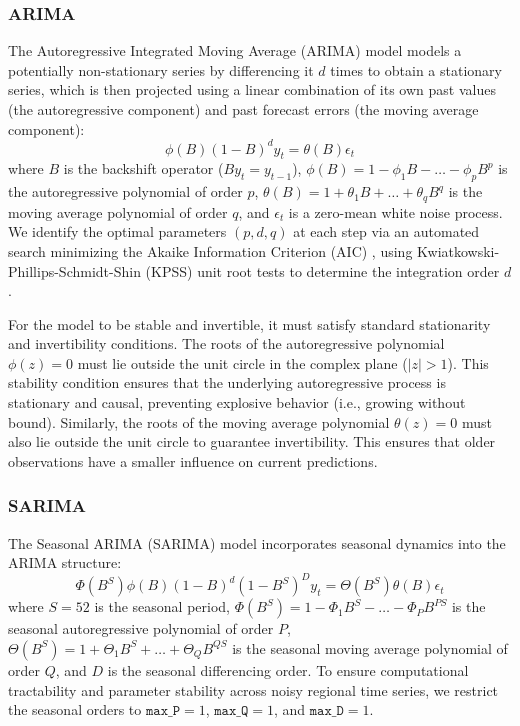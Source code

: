 \subsubsection{ARIMA}
The Autoregressive Integrated Moving Average (ARIMA) model \cite{boxjenkins} models a potentially non-stationary series by differencing it $d$ times to obtain a stationary series, which is then projected using a linear combination of its own past values (the autoregressive component) and past forecast errors (the moving average component):
\begin{equation}
\phi(B)(1-B)^d y_t = \theta(B)\epsilon_t
\end{equation}
where $B$ is the backshift operator ($B y_t = y_{t-1}$), $\phi(B) = 1 - \phi_1 B - \dots - \phi_p B^p$ is the autoregressive polynomial of order $p$, $\theta(B) = 1 + \theta_1 B + \dots + \theta_q B^q$ is the moving average polynomial of order $q$, and $\epsilon_t$ is a zero-mean white noise process. We identify the optimal parameters $(p, d, q)$ at each step via an automated search minimizing the Akaike Information Criterion (AIC) \cite{hyndman2008automatic}, using Kwiatkowski-Phillips-Schmidt-Shin (KPSS) unit root tests to determine the integration order $d$.

For the model to be stable and invertible, it must satisfy standard stationarity and invertibility conditions. The roots of the autoregressive polynomial $\phi(z) = 0$ must lie outside the unit circle in the complex plane ($|z| > 1$). This stability condition ensures that the underlying autoregressive process is stationary and causal, preventing explosive behavior (i.e., growing without bound). Similarly, the roots of the moving average polynomial $\theta(z) = 0$ must also lie outside the unit circle to guarantee invertibility. This ensures that older observations have a smaller influence on current predictions.

\subsubsection{SARIMA}
The Seasonal ARIMA (SARIMA) model incorporates seasonal dynamics into the ARIMA structure:
\begin{equation}
\Phi(B^S)\phi(B)(1-B)^d (1-B^S)^D y_t = \Theta(B^S)\theta(B)\epsilon_t
\end{equation}
where $S=52$ is the seasonal period, $\Phi(B^S) = 1 - \Phi_1 B^S - \dots - \Phi_P B^{PS}$ is the seasonal autoregressive polynomial of order $P$, $\Theta(B^S) = 1 + \Theta_1 B^S + \dots + \Theta_Q B^{QS}$ is the seasonal moving average polynomial of order $Q$, and $D$ is the seasonal differencing order. To ensure computational tractability and parameter stability across noisy regional time series, we restrict the seasonal orders to $\texttt{max\_P} = 1$, $\texttt{max\_Q} = 1$, and $\texttt{max\_D} = 1$.

